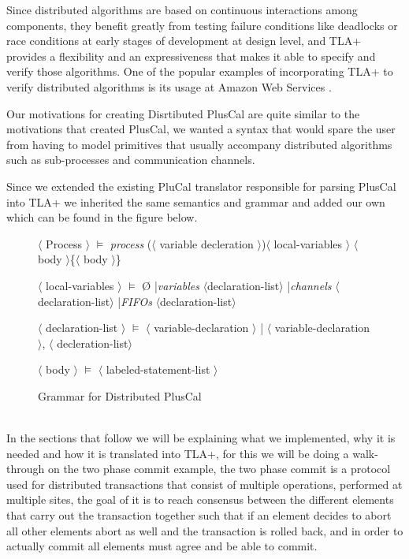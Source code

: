 \documentclass{thesul}
\begin{document}
Since distributed algorithms are based on continuous interactions among components, they benefit greatly from testing failure conditions like deadlocks or race conditions at early stages of development at design level, and TLA+ provides a flexibility and an expressiveness that makes it able to specify and verify those algorithms. One of the popular examples of incorporating TLA+ to verify distributed algorithms is its usage at Amazon Web Services \cite{amazon}.

Our motivations for creating Disrtibuted PlusCal are quite similar to the motivations that created PlusCal, we wanted a syntax that would spare the user from having to model primitives that usually accompany distributed algorithms such as sub-processes and communication channels.

Since we extended the existing PluCal translator responsible for parsing PlusCal into TLA+ we inherited the same semantics and grammar and added our own which can be found in the figure below.

\begin{figure}[!h]

$\langle$ Process $\rangle$ $\models$ \textit{process} ($\langle$ variable decleration $\rangle$)$\langle$ local-variables $\rangle$ 
$\langle$ body $\rangle$\{$\langle$ body $\rangle$\}

$\langle$ local-variables $\rangle$ $\models$ \O  
|\textit{variables} $\langle$declaration-list$\rangle$ 
|\textit{channels} $\langle$declaration-list$\rangle$ 
|\textit{FIFOs} $\langle$declaration-list$\rangle$ 

$\langle$ declaration-list $\rangle$ $\models$ 
$\langle$ variable-declaration $\rangle$ | 
$\langle$ variable-declaration $\rangle$, $\langle$ decleration-list$\rangle$

$\langle$ body $\rangle$ $\models$ 
$\langle$ labeled-statement-list $\rangle$

\caption{Grammar for Distributed PlusCal}

\end{figure}

\hfill\\
In the sections that follow we will be explaining what we implemented, why it is needed and how it is translated into TLA+, for this we will be doing a walk-through on the two phase commit example, the two phase commit is a protocol used for distributed transactions that consist of multiple operations, performed at multiple sites, the goal of it is to reach consensus between the different elements that carry out the transaction together such that if an element decides to abort all other elements abort as well and the transaction is rolled back, and in order to actually commit all elements must agree and be able to commit.
\end{document}
